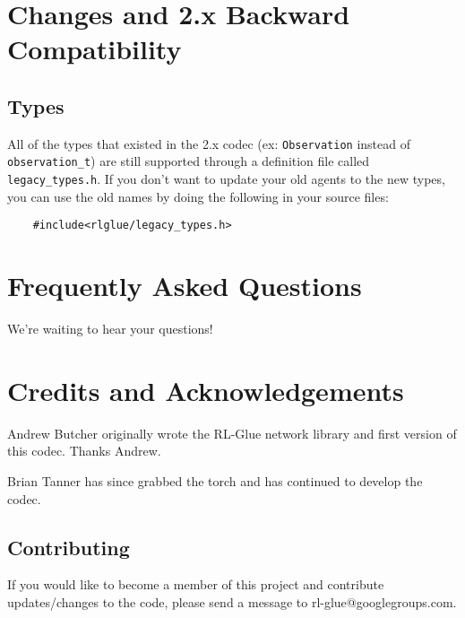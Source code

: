 \documentclass[11pt]{article}
\begin{document}
\section{Changes and 2.x Backward Compatibility}
\subsection{Types}
All of the types that existed in the 2.x codec (ex: \texttt{Observation} instead of \texttt{observation\_t}) are still supported through a definition file called 
\texttt{legacy\_types.h}.  If you don't want to update your old agents to the new types, you can use the old names by doing the following in your source files:
\begin{verbatim}
	#include<rlglue/legacy_types.h>
\end{verbatim}



\section{Frequently Asked Questions}
We're waiting to hear your questions!

\section{Credits and Acknowledgements}
Andrew Butcher originally wrote the RL-Glue network library and first version of this codec.  Thanks Andrew.

Brian Tanner has since grabbed the torch and has continued to develop the codec.

\subsection{Contributing}
If you would like to become a member of this project and contribute updates/changes to the code, please send a message to rl-glue@googlegroups.com.
\end{document}

